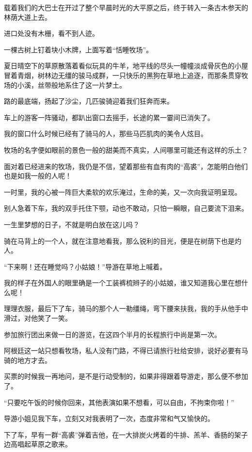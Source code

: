 \par 载着我们的大巴士在开过了整个早晨时光的大平原之后，终于转入一条古木参天的林荫大道上去。
\par 进口处没有木栅，看不到人迹。
\par 一棵古树上钉着块小木牌，上面写着“恬睡牧场”。
\par 夏日晴空下的草原散落着看似玩具的牛羊，地平线的尽头一幢幢淡成骨灰色的小屋冒着青烟，树林边无缰的骏马成群，一只快乐的黑狗在草地上追逐，而那条贯穿牧场的小溪，丝带般地系住了这一片梦土。
\par 路的最底端，扬起了沙尘，几匹骏骑迎着我们狂奔而来。
\par 车上的游客一阵骚动，都趴出窗口去摇手，长途的累一霎间已消失了。
\par 我的窗口什么时候已经有了骑马的人，那些马匹肌肉的美令人炫目。
\par 牧场的名字便如眼前的景色一般的甜美而不真实，人间哪里可能还有这样的乐土？
\par 面对着已经进来的牧场，我仍是不信，望着那些有血有肉的“高裘”，怎能明白他们也是如我一般的人呢！
\par 一时里，我的心被一阵巨大柔软的欢乐淹过，生命的美，又一次向我证明呈现。
\par 别人急着下车，我的双手托住下颚，动也不敢动，只怕一瞬眼，自己要流下泪来。
\par 一生里梦想的日子，不就是明白放在这儿吗？
\par 骑在马背上的一个人，就在注意地看我，那么锐利的目光，便是在树荫下也是灼人。
\par “下来啊！还在睡觉吗？小姑娘！”导游在草地上喊着。
\par 我的样子在外国人的眼里确是一个工装裤梳辫子的小姑娘，谁又知道我心里在想什么呢！
\par 理理衣服，最后下了车，骑马的那个人一勒缰绳，弯下腰来扶我，我的手从他手中滑过，对他笑了一笑。
\par 参加旅行团出来做一日的游览，在这四个半月的长程旅行中尚是第一次。
\par 阿根廷这一站只想看牧场，私人没有门路，不得已请旅行社给安排，说好必要有马骑的地方才去。
\par 买票的时候我一再地问，是不是行动受制的，如果非得跟着导游走，那么便不参加了。
\par “只要吃午饭的时候你回来，其他表演如果不想看，可以自由，不拘束你啦！”
\par 导游小姐见我下车，立刻又对我表明了一次，态度非常和气又愉快的。
\par 下了车，早有一群“高裘”弹着吉他，在一大排炭火烤着的牛排、羔羊、香肠的架子边高唱起草原之歌来。
